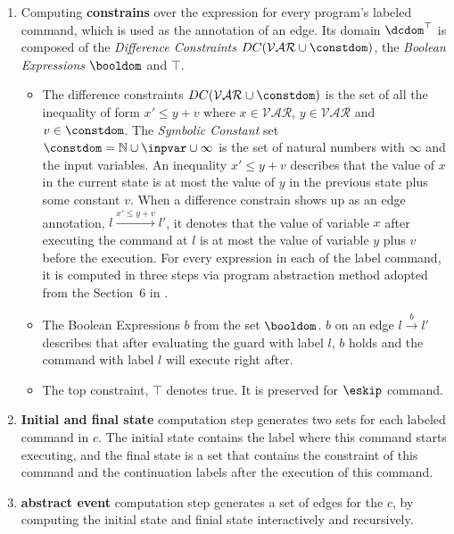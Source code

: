 \begin{enumerate}
    \item Computing \textbf{constrains} over the expression for every program's labeled command,
  which is used as the annotation of an edge.
  Its domain $\dcdom^{\top}$ is composed of the \emph{Difference Constraints} $DC(\mathcal{VAR}  \cup \constdom)$,
  the \emph{Boolean Expressions} $\booldom$ and $\top$.
%
\begin{itemize}
\item The difference constraints $DC(\mathcal{VAR}  \cup \constdom)$ is the set of all the inequality of
form $x' \leq y + v$ where $x \in \mathcal{VAR} $, 
$y \in \mathcal{VAR}$ and $v \in \constdom$.
The \emph{Symbolic Constant} set $\constdom = \mathbb{N} \cup \inpvar \cup {\infty}$
is the set of natural numbers with $\infty$ and the input variables.
An inequality $x' \leq y + v$ describes that the value of $x$ in the current state is
at most the value of $y$ in the previous state plus some constant $v$.
When a difference constrain shows up as an edge annotation, $l \xrightarrow{x' \leq y + v} l'$,
it denotes that
the value of variable $x$
after executing the command at $l$ is at most
the value of variable $y$ plus $v$ before the execution.
For every expression in each of the label command, it is computed in three steps via program abstraction method adopted from the Section~6 in \cite{sinn2017complexity}. 
%
\item The Boolean Expressions $b$ from the set $\booldom$.
$b$ on an edge $l \xrightarrow{b} l'$ describes
that after evaluating the guard with label $l$,
$b$ holds and the command with label $l$ will execute right after.
%
\item The top constraint, $\top$ denotes true. It is preserved for $\eskip$ command.
%
\end{itemize}
    \item \textbf{Initial and final state} computation step generates two sets for each labeled command in $c$. 
  The initial state contains the
  label where this command {starts} executing, 
  and the final state is a set
  that contains the constraint of this command
  and the continuation labels after the execution of this command.
 \item \textbf{abstract event} computation step generates a set of edges for the $c$, by computing the initial state and finial state interactively and recursively.
\end{enumerate}

